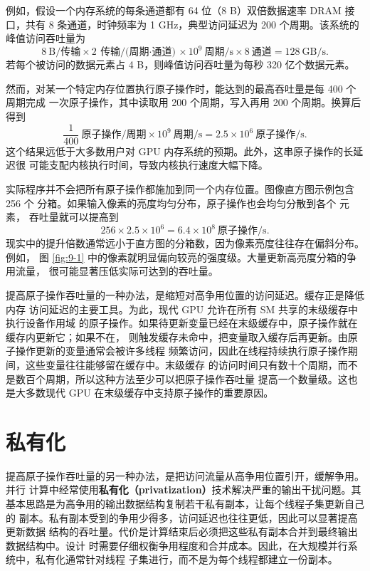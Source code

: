 例如，假设一个内存系统的每条通道都有 64 位（8 B）双倍数据速率 DRAM 接口，共有
8 条通道，时钟频率为 1 GHz，典型访问延迟为 200 个周期。该系统的峰值访问吞吐量为
\[
  8\ \text{B/传输}
  \times 2\ \text{传输/(周期$\cdot$通道)}
  \times 10^9\ \text{周期/s}
  \times 8\ \text{通道}
  = 128\ \text{GB/s}.
\]
若每个被访问的数据元素占 4 B，则峰值访问吞吐量为每秒 320 亿个数据元素。

然而，对某一个特定内存位置执行原子操作时，能达到的最高吞吐量是每 400 个周期完成
一次原子操作，其中读取用 200 个周期，写入再用 200 个周期。换算后得到
\[
  \frac{1}{400}\ \text{原子操作/周期}
  \times 10^9\ \text{周期/s}
  = 2.5\times10^6\ \text{原子操作/s}.
\]
这个结果远低于大多数用户对 GPU 内存系统的预期。此外，这串原子操作的长延迟很
可能支配内核执行时间，导致内核执行速度大幅下降。

实际程序并不会把所有原子操作都施加到同一个内存位置。图像直方图示例包含 256 个
分箱。如果输入像素的亮度均匀分布，原子操作也会均匀分散到各个  元素，
吞吐量就可以提高到
\[
  256\times 2.5\times10^6
  = 6.4\times10^8\ \text{原子操作/s}.
\]
现实中的提升倍数通常远小于直方图的分箱数，因为像素亮度往往存在偏斜分布。例如，
图 \ref{fig:9-1} 中的像素就明显偏向较亮的强度级。大量更新高亮度分箱的争用流量，
很可能显著压低实际可达到的吞吐量。

提高原子操作吞吐量的一种办法，是缩短对高争用位置的访问延迟。缓存正是降低内存
访问延迟的主要工具。为此，现代 GPU 允许在所有 SM 共享的末级缓存中执行设备作用域
的原子操作。如果待更新变量已经在末级缓存中，原子操作就在缓存内更新它；如果不在，
则触发缓存未命中，把变量取入缓存后再更新。由原子操作更新的变量通常会被许多线程
频繁访问，因此在线程持续执行原子操作期间，这些变量往往能够留在缓存中。末级缓存
的访问时间只有数十个周期，而不是数百个周期，所以这种方法至少可以把原子操作吞吐量
提高一个数量级。这也是大多数现代 GPU 在末级缓存中支持原子操作的重要原因。

\section{私有化}
\label{sec:histogram-privatization}

提高原子操作吞吐量的另一种办法，是把访问流量从高争用位置引开，缓解争用。并行
计算中经常使用\textbf{私有化（privatization）}技术解决严重的输出干扰问题。其
基本思路是为高争用的输出数据结构复制若干私有副本，让每个线程子集更新自己的
副本。私有副本受到的争用少得多，访问延迟也往往更低，因此可以显著提高更新数据
结构的吞吐量。代价是计算结束后必须把这些私有副本合并到最终输出数据结构中。设计
时需要仔细权衡争用程度和合并成本。因此，在大规模并行系统中，私有化通常针对线程
子集进行，而不是为每个线程都建立一份副本。

